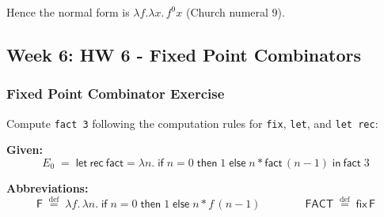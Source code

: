 \documentclass{article}
\theoremstyle{theorem}
\theoremstyle{definition}
\theoremstyle{remark}
\begin{document}
Hence the normal form is $\lambda f.\lambda x.\,f^{9}x$ (Church numeral $9$).

\subsection{Week 6: HW 6 - Fixed Point Combinators}

\subsubsection{Fixed Point Combinator Exercise}

Compute \texttt{fact 3} following the computation rules for \texttt{fix}, \texttt{let}, and \texttt{let rec}:

\textbf{Given:}
\[
E_0 \;=\; \mathsf{let\ rec\ fact} = \lambda n.\; \mathsf{if}\;n=0\;\mathsf{then}\;1\;\mathsf{else}\;n * \mathsf{fact}\,(n-1)\;\mathsf{in\ fact}\;3
\]

\textbf{Abbreviations:}
\[
\mathsf{F} \;\overset{\mathrm{def}}{=}\; \lambda f.\,\lambda n.\; \mathsf{if}\;n=0\;\mathsf{then}\;1\;\mathsf{else}\;n * f\,(n-1)
\qquad\qquad
\mathsf{FACT} \;\overset{\mathrm{def}}{=}\; \mathsf{fix}\,\mathsf{F}
\]
\end{document}
